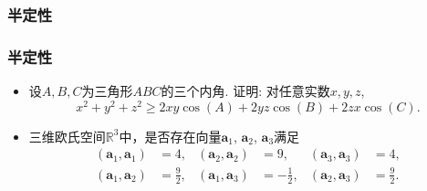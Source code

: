 \subsubsection{半定性}
\begin{frame}\frametitle{半定性}
\begin{example}
\begin{itemize}
\item 设$A, B, C$为三角形$ABC$的三个内角. 证明: 对任意实数$x, y, z$,
\[x^2 + y^2 + z^2 \geq 2xy\cos(A) + 2yz\cos(B) + 2zx\cos(C).\]
\pp
{}
\pp
\bigskip

\item 三维欧氏空间$\mathbb{R}^3$中，是否存在向量$\mathbf{a}_1$, $\mathbf{a}_2$, $\mathbf{a}_3$满足
\begin{align*}
(\mathbf{a}_1, \mathbf{a}_1) &= 4, & (\mathbf{a}_2, \mathbf{a}_2) &= 9, & (\mathbf{a}_3, \mathbf{a}_3) &= 4, \\
(\mathbf{a}_1, \mathbf{a}_2) &= \frac{9}{2}, & (\mathbf{a}_1, \mathbf{a}_3) &= -\frac{1}{2}, & (\mathbf{a}_2, \mathbf{a}_3) &= \frac{9}{2}.
\end{align*}
\pp
{}
\end{itemize}
\end{example}
\end{frame}


\renewcommand{\mydate}{2025年06月19日\ 三十一次课}


